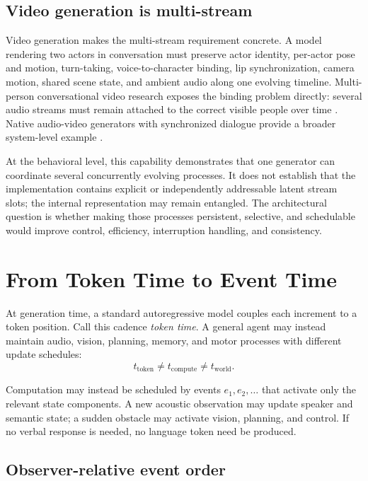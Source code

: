 \documentclass[10pt,twocolumn]{article}
\begin{document}
\subsection{Video generation is multi-stream}

Video generation makes the multi-stream requirement concrete. A model rendering two actors in conversation must preserve actor identity, per-actor pose and motion, turn-taking, voice-to-character binding, lip synchronization, camera motion, shared scene state, and ambient audio along one evolving timeline. Multi-person conversational video research exposes the binding problem directly: several audio streams must remain attached to the correct visible people over time \cite{kong2025multitalk}. Native audio-video generators with synchronized dialogue provide a broader system-level example \cite{openai2025sora2}.

At the behavioral level, this capability demonstrates that one generator can coordinate several concurrently evolving processes. It does not establish that the implementation contains explicit or independently addressable latent stream slots; the internal representation may remain entangled. The architectural question is whether making those processes persistent, selective, and schedulable would improve control, efficiency, interruption handling, and consistency.

\section{From Token Time to Event Time}

At generation time, a standard autoregressive model couples each increment to a token position. Call this cadence \emph{token time}. A general agent may instead maintain audio, vision, planning, memory, and motor processes with different update schedules:
\begin{equation}
  t_{\mathrm{token}} \neq t_{\mathrm{compute}} \neq t_{\mathrm{world}}.
\end{equation}

Computation may instead be scheduled by events $e_1,e_2,\ldots$ that activate only the relevant state components. A new acoustic observation may update speaker and semantic state; a sudden obstacle may activate vision, planning, and control. If no verbal response is needed, no language token need be produced.

\subsection{Observer-relative event order}
\end{document}
